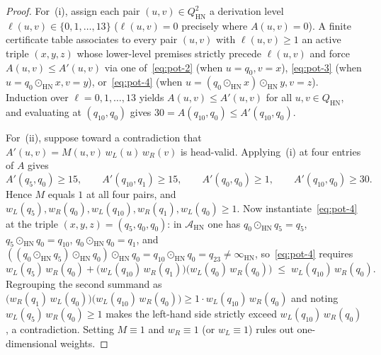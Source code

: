 \documentclass[11pt,reqno]{amsart}
\numberwithin{equation}{section}
\theoremstyle{plain}
\theoremstyle{definition}
\theoremstyle{remark}
\newcommand{\HN}{\mathrm{HN}}
\begin{document}
\begin{proof}
For~(i), assign each pair $(u, v) \in Q_{\HN}^2$ a derivation level $\ell(u, v) \in \{0, 1, \dots, 13\}$ ($\ell(u, v) = 0$ precisely where $A(u, v) = 0$). A finite certificate table associates to every pair $(u, v)$ with $\ell(u, v) \ge 1$ an active triple $(x, y, z)$ whose lower-level premises strictly precede $\ell(u, v)$ and force $A(u, v) \le A'(u, v)$ via one of~\eqref{eq:pot-2} (when $u = q_0, v = x$), \eqref{eq:pot-3} (when $u = q_0 \odot_{\HN} x, v = y$), or~\eqref{eq:pot-4} (when $u = (q_0 \odot_{\HN} x) \odot_{\HN} y, v = z$). Induction over $\ell = 0, 1, \dots, 13$ yields $A(u, v) \le A'(u, v)$ for all $u, v \in Q_{\HN}$, and evaluating at $(q_{10}, q_0)$ gives $30 = A(q_{10}, q_0) \le A'(q_{10}, q_0)$.

For~(ii), suppose toward a contradiction that $A'(u, v) = M(u, v)\,w_L(u)\,w_R(v)$ is head-valid. Applying~(i) at four entries of $A$ gives
\[
A'(q_5, q_0) \ge 15, \qquad A'(q_{10}, q_1) \ge 15, \qquad A'(q_0, q_0) \ge 1, \qquad A'(q_{10}, q_0) \ge 30.
\]
Hence $M$ equals $1$ at all four pairs, and $w_L(q_5), w_R(q_0), w_L(q_{10}), w_R(q_1), w_L(q_0) \ge 1$. Now instantiate~\eqref{eq:pot-4} at the triple $(x, y, z) = (q_5, q_0, q_0)$: in $\mathcal{A}_{\HN}$ one has $q_0 \odot_{\HN} q_5 = q_5$, $q_5 \odot_{\HN} q_0 = q_{10}$, $q_0 \odot_{\HN} q_0 = q_1$, and $((q_0 \odot_{\HN} q_5) \odot_{\HN} q_0) \odot_{\HN} q_0 = q_{10} \odot_{\HN} q_0 = q_{23} \neq \infty_{\HN}$, so~\eqref{eq:pot-4} requires
\[
w_L(q_5)\,w_R(q_0) + \bigl(w_L(q_{10})\,w_R(q_1)\bigr)\bigl(w_L(q_0)\,w_R(q_0)\bigr) \;\le\; w_L(q_{10})\,w_R(q_0).
\]
Regrouping the second summand as $\bigl(w_R(q_1)\,w_L(q_0)\bigr)\bigl(w_L(q_{10})\,w_R(q_0)\bigr) \ge 1 \cdot w_L(q_{10})\,w_R(q_0)$ and noting $w_L(q_5)\,w_R(q_0) \ge 1$ makes the left-hand side strictly exceed $w_L(q_{10})\,w_R(q_0)$, a contradiction. Setting $M \equiv 1$ and $w_R \equiv 1$ (or $w_L \equiv 1$) rules out one-dimensional weights.
\end{proof}
\end{document}
